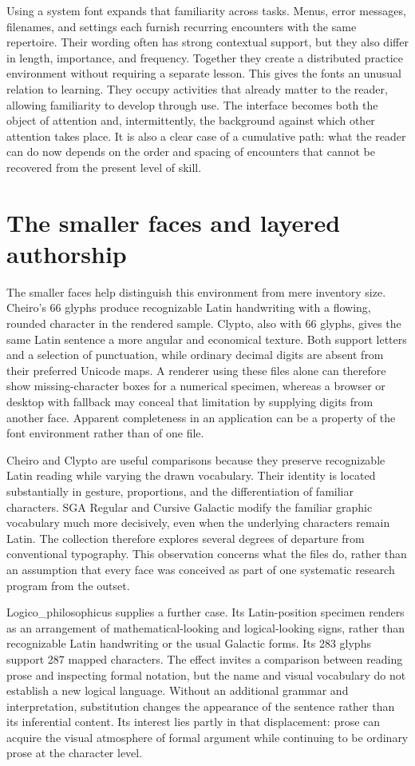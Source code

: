 \documentclass[11pt]{article}
\begin{document}
Using a system font expands that familiarity across tasks. Menus, error messages, filenames, and settings each furnish recurring encounters with the same repertoire. Their wording often has strong contextual support, but they also differ in length, importance, and frequency. Together they create a distributed practice environment without requiring a separate lesson. This gives the fonts an unusual relation to learning. They occupy activities that already matter to the reader, allowing familiarity to develop through use. The interface becomes both the object of attention and, intermittently, the background against which other attention takes place. It is also a clear case of a cumulative path: what the reader can do now depends on the order and spacing of encounters that cannot be recovered from the present level of skill.

\section{The smaller faces and layered authorship}

The smaller faces help distinguish this environment from mere inventory size. Cheiro's 66 glyphs produce recognizable Latin handwriting with a flowing, rounded character in the rendered sample. Clypto, also with 66 glyphs, gives the same Latin sentence a more angular and economical texture. Both support letters and a selection of punctuation, while ordinary decimal digits are absent from their preferred Unicode maps. A renderer using these files alone can therefore show missing-character boxes for a numerical specimen, whereas a browser or desktop with fallback may conceal that limitation by supplying digits from another face. Apparent completeness in an application can be a property of the font environment rather than of one file.

Cheiro and Clypto are useful comparisons because they preserve recognizable Latin reading while varying the drawn vocabulary. Their identity is located substantially in gesture, proportions, and the differentiation of familiar characters. SGA Regular and Cursive Galactic modify the familiar graphic vocabulary much more decisively, even when the underlying characters remain Latin. The collection therefore explores several degrees of departure from conventional typography. This observation concerns what the files do, rather than an assumption that every face was conceived as part of one systematic research program from the outset.

Logico\_philosophicus supplies a further case. Its Latin-position specimen renders as an arrangement of mathematical-looking and logical-looking signs, rather than recognizable Latin handwriting or the usual Galactic forms. Its 283 glyphs support 287 mapped characters. The effect invites a comparison between reading prose and inspecting formal notation, but the name and visual vocabulary do not establish a new logical language. Without an additional grammar and interpretation, substitution changes the appearance of the sentence rather than its inferential content. Its interest lies partly in that displacement: prose can acquire the visual atmosphere of formal argument while continuing to be ordinary prose at the character level.
\end{document}
